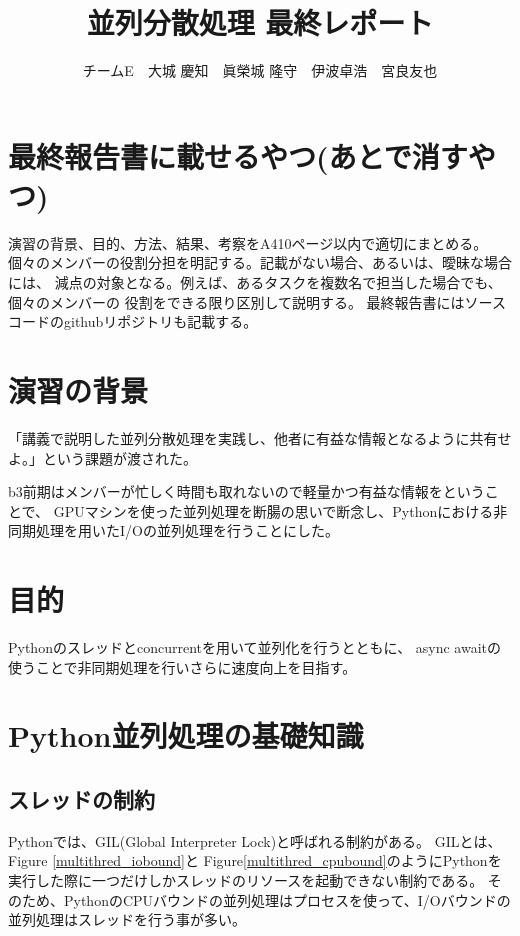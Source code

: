 \documentclass[14pt, oneside]{article}     	%
\title{並列分散処理  最終レポート}
\author{チームE　大城 慶知　眞榮城 隆守　伊波卓浩　宮良友也}
\begin{document}
\maketitle

\section*{最終報告書に載せるやつ(あとで消すやつ)}

演習の背景、目的、方法、結果、考察をA410ページ以内で適切にまとめる。
個々のメンバーの役割分担を明記する。記載がない場合、あるいは、曖昧な場合には、
減点の対象となる。例えば、あるタスクを複数名で担当した場合でも、個々のメンバーの
役割をできる限り区別して説明する。
最終報告書にはソースコードのgithubリポジトリも記載する。

\section{演習の背景}
「講義で説明した並列分散処理を実践し、他者に有益な情報となるように共有せよ。」という課題が渡された。

b3前期はメンバーが忙しく時間も取れないので軽量かつ有益な情報をということで、
GPUマシンを使った並列処理を断腸の思いで断念し、Pythonにおける非同期処理を用いたI/Oの並列処理を行うことにした。

\section{目的}
Pythonのスレッドとconcurrentを用いて並列化を行うとともに、
async awaitの使うことで非同期処理を行いさらに速度向上を目指す。


\section{Python並列処理の基礎知識}

\subsection{スレッドの制約}
Pythonでは、GIL(Global Interpreter Lock)と呼ばれる制約がある。
GILとは、Figure \ref{multithred_iobound}と Figure\ref{multithred_cpubound}のようにPythonを実行した際に一つだけしかスレッドのリソースを起動できない制約である。
そのため、PythonのCPUバウンドの並列処理はプロセスを使って、I/Oバウンドの並列処理はスレッドを行う事が多い。
\end{document}
